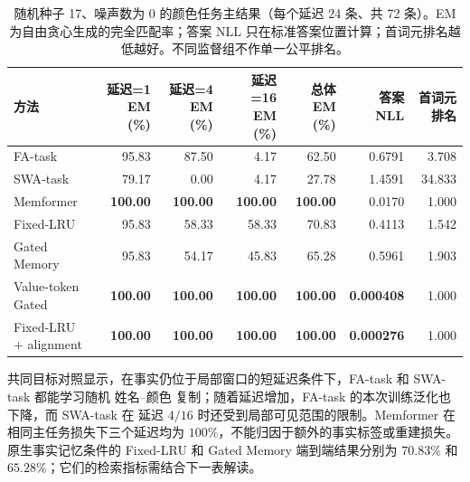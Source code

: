 \documentclass[letterpaper]{article}
\begin{document}
\begin{table}[t]
\centering
\scriptsize
\caption{随机种子 17、噪声数为 0 的颜色任务主结果（每个延迟 24 条、共 72 条）。EM 为自由贪心生成的完全匹配率；答案 NLL 只在标准答案位置计算；首词元排名越低越好。不同监督组不作单一公平排名。}
\label{tab:main}
\begin{tabular}{lrrrrrr}
\toprule
方法 & 延迟=1 EM (\%) & 延迟=4 EM (\%) & 延迟=16 EM (\%) & 总体 EM (\%) & 答案 NLL & 首词元排名 \\
\midrule
FA-task & 95.83 & 87.50 & 4.17 & 62.50 & 0.6791 & 3.708 \\
SWA-task & 79.17 & 0.00 & 4.17 & 27.78 & 1.4591 & 34.833 \\
Memformer & \textbf{100.00} & \textbf{100.00} & \textbf{100.00} & \textbf{100.00} & 0.0170 & 1.000 \\
Fixed-LRU & 95.83 & 58.33 & 58.33 & 70.83 & 0.4113 & 1.542 \\
Gated Memory & 95.83 & 54.17 & 45.83 & 65.28 & 0.5961 & 1.903 \\
Value-token Gated & \textbf{100.00} & \textbf{100.00} & \textbf{100.00} & \textbf{100.00} & \textbf{0.000408} & 1.000 \\
Fixed-LRU + alignment & \textbf{100.00} & \textbf{100.00} & \textbf{100.00} & \textbf{100.00} & \textbf{0.000276} & 1.000 \\
\bottomrule
\end{tabular}
\end{table}

共同目标对照显示，在事实仍位于局部窗口的短延迟条件下，FA-task 和 SWA-task 都能学习随机
姓名--颜色 复制；随着延迟增加，FA-task 的本次训练泛化也下降，而 SWA-task 在
延迟 $4/16$ 时还受到局部可见范围的限制。Memformer 在相同主任务损失下三个延迟均为
$100\%$，不能归因于额外的事实标签或重建损失。原生事实记忆条件的 Fixed-LRU 和 Gated Memory
端到端结果分别为 $70.83\%$ 和 $65.28\%$；它们的检索指标需结合下一表解读。

\begin{table}[t]
\centering
\scriptsize
\caption{原生事实记忆条件的写入与读取诊断（噪声数为 0）。表中“读@4”为读取命中率，“值段”和“记忆词元”分别为值片段与记忆词元完全匹配率；``--'' 表示未启用对齐头。}
\label{tab:native-memory}
%
\end{table}
\end{document}
